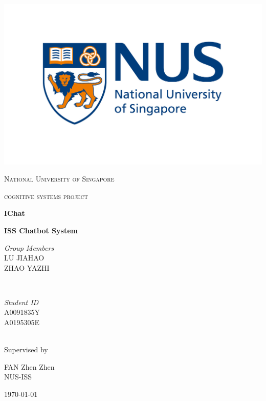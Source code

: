 \begin{titlepage}


\thispagestyle{empty}
\setlength\headheight{0pt}
\begin{center}

\begin{center}
\includegraphics[width=0.8\linewidth]{img/NUS_logo.jpg}
\end{center}

{\scshape\LARGE National University of Singapore \par}
\vspace{0.25cm}
{\scshape\Large cognitive systems project\par}
\vspace{0.5cm}

{\Large\bfseries IChat}

{\large\bfseries ISS Chatbot System}

\vspace{0.5cm}

\begin{minipage}{0.6\textwidth}
	\begin{flushleft} \large
    \emph{Group Members}\\
      LU JIAHAO\\
      ZHAO YAZHI\\
	\end{flushleft}
\end{minipage}~
\begin{minipage}{0.2\textwidth}
  \begin{flushright} \large
    \emph{Student ID}\\
    A0091835Y\\
    A0195305E\\
  \end{flushright}
\end{minipage}\\

\vspace{4cm}
Supervised by\par
FAN Zhen Zhen\\
NUS-ISS\par
\vspace{1.5cm}
\large
\today

\end{center}

\clearpage
\restoregeometry
\end{titlepage}
